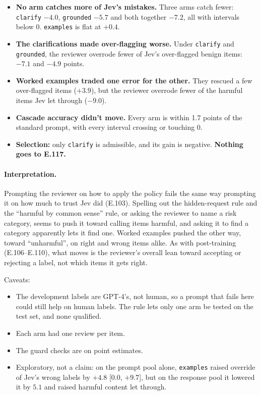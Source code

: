 \documentclass[11pt]{article}
\renewcommand{\_}{\origunderscore\allowbreak}
\begin{document}
\begin{itemize}[leftmargin=*]
  \item \textbf{No arm catches more of Jev's mistakes.} Three arms catch fewer: \texttt{clarify} $-4.0$, \texttt{grounded} $-5.7$ and both together $-7.2$, all with intervals below 0. \texttt{examples} is flat at $+0.4$.
  \item \textbf{The clarifications made over-flagging worse.} Under \texttt{clarify} and \texttt{grounded}, the reviewer overrode fewer of Jev's over-flagged benign items: $-7.1$ and $-4.9$ points.
  \item \textbf{Worked examples traded one error for the other.} They rescued a few over-flagged items ($+3.9$), but the reviewer overrode fewer of the harmful items Jev let through ($-9.0$).
  \item \textbf{Cascade accuracy didn't move.} Every arm is within 1.7 points of the standard prompt, with every interval crossing or touching 0.
  \item \textbf{Selection:} only \texttt{clarify} is admissible, and its gain is negative. \textbf{Nothing goes to E.117.}
\end{itemize}

\paragraph{Interpretation.}
Prompting the reviewer on how to apply the policy fails the same way prompting it on how much to trust Jev did (E.103). Spelling out the hidden-request rule and the ``harmful by common sense'' rule, or asking the reviewer to name a risk category, seems to push it toward calling items harmful, and asking it to find a category apparently lets it find one. Worked examples pushed the other way, toward ``unharmful'', on right and wrong items alike. As with post-training (E.106--E.110), what moves is the reviewer's overall lean toward accepting or rejecting a label, not which items it gets right.

Caveats:
\begin{itemize}[leftmargin=*,itemsep=2pt]
  \item The development labels are GPT-4's, not human, so a prompt that fails here could still help on human labels. The rule lets only one arm be tested on the test set, and none qualified.
  \item Each arm had one review per item.
  \item The guard checks are on point estimates.
  \item Exploratory, not a claim: on the prompt pool alone, \texttt{examples} raised override of Jev's wrong labels by $+4.8$ [$0.0$, $+9.7$], but on the response pool it lowered it by $5.1$ and raised harmful content let through.
\end{itemize}
\end{document}
